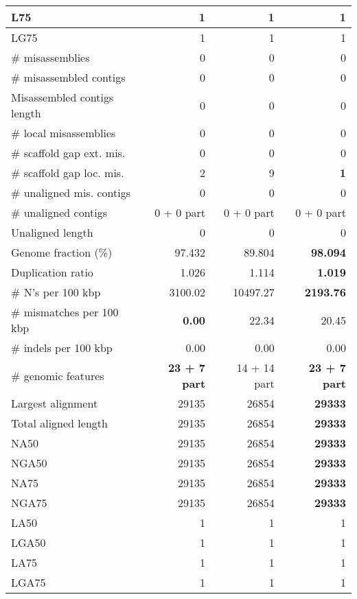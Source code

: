 \documentclass[12pt,a4paper]{article}
\begin{document}
\begin{table}[ht]
\begin{center}
\begin{tabular}{|l*{3}{|r}|}
L75 & 1 & 1 & 1 \\ \hline
LG75 & 1 & 1 & 1 \\ \hline
\# misassemblies & 0 & 0 & 0 \\ \hline
\# misassembled contigs & 0 & 0 & 0 \\ \hline
Misassembled contigs length & 0 & 0 & 0 \\ \hline
\# local misassemblies & 0 & 0 & 0 \\ \hline
\# scaffold gap ext. mis. & 0 & 0 & 0 \\ \hline
\# scaffold gap loc. mis. & 2 & 9 & {\bf 1} \\ \hline
\# unaligned mis. contigs & 0 & 0 & 0 \\ \hline
\# unaligned contigs & 0 + 0 part & 0 + 0 part & 0 + 0 part \\ \hline
Unaligned length & 0 & 0 & 0 \\ \hline
Genome fraction (\%) & 97.432 & 89.804 & {\bf 98.094} \\ \hline
Duplication ratio & 1.026 & 1.114 & {\bf 1.019} \\ \hline
\# N's per 100 kbp & 3100.02 & 10497.27 & {\bf 2193.76} \\ \hline
\# mismatches per 100 kbp & {\bf 0.00} & 22.34 & 20.45 \\ \hline
\# indels per 100 kbp & 0.00 & 0.00 & 0.00 \\ \hline
\# genomic features & {\bf 23 + 7 part} & 14 + 14 part & {\bf 23 + 7 part} \\ \hline
Largest alignment & 29135 & 26854 & {\bf 29333} \\ \hline
Total aligned length & 29135 & 26854 & {\bf 29333} \\ \hline
NA50 & 29135 & 26854 & {\bf 29333} \\ \hline
NGA50 & 29135 & 26854 & {\bf 29333} \\ \hline
NA75 & 29135 & 26854 & {\bf 29333} \\ \hline
NGA75 & 29135 & 26854 & {\bf 29333} \\ \hline
LA50 & 1 & 1 & 1 \\ \hline
LGA50 & 1 & 1 & 1 \\ \hline
LA75 & 1 & 1 & 1 \\ \hline
LGA75 & 1 & 1 & 1 \\ \hline
\end{tabular}
\end{center}
\end{table}
\end{document}

